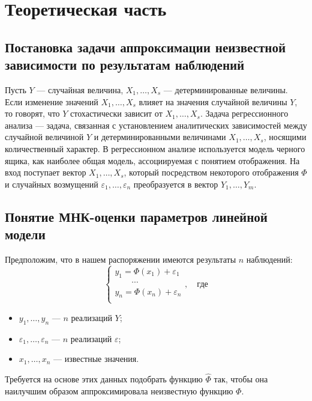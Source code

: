 
\section{Теоретическая часть}


\subsection{Постановка задачи аппроксимации неизвестной зависимости по результатам наблюдений}

Пусть $Y$ --- случайная величина, $X_1, \dots, X_s$ --- детерминированные величины. Если изменение значений $X_1, \dots, X_s$ влияет на значения случайной величины $Y$, то говорят, что $Y$ стохастически зависит от $X_1, \dots, X_s$. Задача регрессионного анализа --- задача, связанная с установлением аналитических зависимостей между случайной величиной $Y$ и детерминированными величинами $X_1, \dots, X_s$, носящими количественный характер. 
В регрессионном анализе используется модель черного ящика, как наиболее общая модель, ассоциируемая с понятием отображения. На вход поступает вектор $X_1, \dots, X_s$, который посредством некоторого отображения $\Phi$ и случайных возмущений $\varepsilon_1, \dots, \varepsilon_n$ преобразуется в вектор $Y_1, \dots, Y_m$.

\subsection{Понятие МНК-оценки параметров линейной модели}

Предположим, что в нашем распоряжении имеются результаты $n$ наблюдений:
\begin{equation}
\begin{cases}
y_1 = \Phi(x_1) + \varepsilon_1 \\
\qquad\cdots                    \\
y_n = \Phi(x_n) + \varepsilon_n \\
\end{cases}, \quad \text{где}
\end{equation}
\begin{itemize}
	\item $y_1, \dots, y_n$ --- $n$ реализаций $Y$;
	\item $\varepsilon_1, \dots, \varepsilon_n$ --- $n$ реализаций $\varepsilon$;
	\item $x_1, \dots, x_n$ --- известные значения.
\end{itemize}
Требуется на основе этих данных подобрать функцию $\widehat{\Phi}$ так, чтобы она наилучшим образом аппроксимировала неизвестную функцию $\Phi$.



